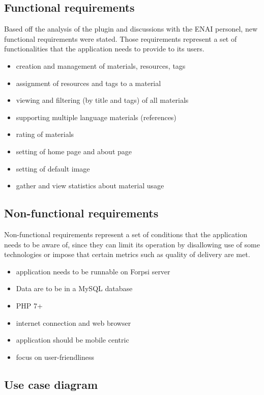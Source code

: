 \documentclass[
  digital,     %
  oneside,     %
  nosansbold,  %
  colorbold, %
  lof,         %
  lot,         %
]{fithesis4}
\begin{document}
\subsection{Functional requirements}

Based off the analysis of the plugin and discussions with the ENAI personel, new functional requirements were stated. Those requirements represent a set of functionalities that the application needs to provide to its users.

\begin{itemize}
    \item creation and management of materials, resources, tags
    \item assignment of resources and tags to a material
    \item viewing and filtering (by title and tags) of all materials
    \item supporting multiple language materials (references)
    \item rating of materials
    \item setting of home page and about page
    \item setting of default image
    \item gather and view statistics about material usage
\end{itemize}

\subsection{Non-functional requirements}

Non-functional requirements represent a set of conditions that the application needs to be aware of, since they can limit its operation by disallowing use of some technologies or impose that certain metrics such as quality of delivery are met.

\begin{itemize}
	\item application needs to be runnable on Forpsi server~\cite{forpsi}
	\item Data are to be in a MySQL database
	\item PHP 7+
	\item internet connection and web browser
	\item application should be mobile centric
	\item focus on user-friendliness
\end{itemize}

\subsection{Use case diagram}
\end{document}
